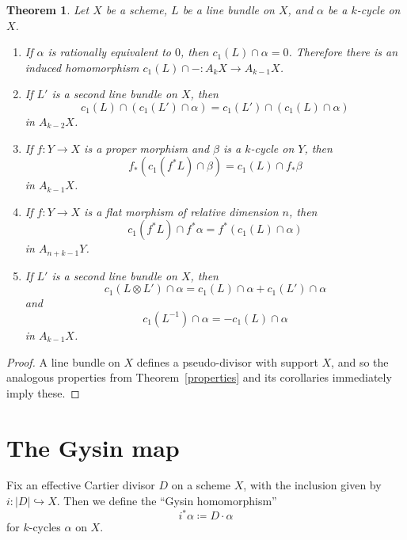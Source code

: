 \documentclass[leqno, openany]{memoir}
\newtheorem{thm}{Theorem}[section]
\theoremstyle{definition}
\theoremstyle{remark}
\theoremstyle{plain}
\theoremstyle{definition}
\theoremstyle{remark}
\begin{document}
\begin{thm} \label{Chern properties} Let $X$ be a scheme, $L$ be a line bundle
    on $X$, and $\alpha$ be a $k$-cycle on $X$.
    \begin{enumerate}[label=(\alph*)] \item If $\alpha$ is rationally
        equivalent to $0$, then $c_1(L) \cap \alpha = 0$. Therefore there is an
        induced homomorphism $c_1(L) \cap - \colon A_k X \to A_{k-1} X$.  \item
        If $L'$ is a second line bundle on $X$, then \[ c_1(L) \cap (c_1(L')
            \cap \alpha) = c_1(L') \cap (c_1(L) \cap \alpha) \] in $A_{k-2}X$.
        \item If $f\colon Y \to X$ is a proper morphism and $\beta$ is a
            $k$-cycle on $Y$, then \[ f_* (c_1(f^* L) \cap \beta) = c_1(L) \cap
            f_* \beta \] in $A_{k-1} X$.  \item If $f\colon Y \to X$ is a flat
            morphism of relative dimension $n$, then \[ c_1(f^* L) \cap f^*
                \alpha = f^* (c_1(L) \cap \alpha) \] in $A_{n+k-1} Y$.  \item
                If $L'$ is a second line bundle on $X$, then \[ c_1(L \otimes
                    L') \cap \alpha = c_1(L) \cap \alpha + c_1(L') \cap \alpha
                    \] and \[ c_1(L^{-1}) \cap \alpha = - c_1(L) \cap \alpha \]
                    in $A_{k-1} X$.  \end{enumerate} \end{thm} \begin{proof} A
                    line bundle on $X$ defines a pseudo-divisor with support
                    $X$, and so the analogous properties from
                    Theorem~\ref{properties} and its corollaries immediately
                    imply these.  \end{proof}

\section{The Gysin map} Fix an effective Cartier divisor $D$ on a scheme $X$,
with the inclusion given by $i\colon |D| \hookrightarrow X$. Then we define the
``Gysin homomorphism'' \[ i^* \alpha \coloneqq D \cdot \alpha \] for $k$-cycles
$\alpha$ on $X$.
\end{document}
